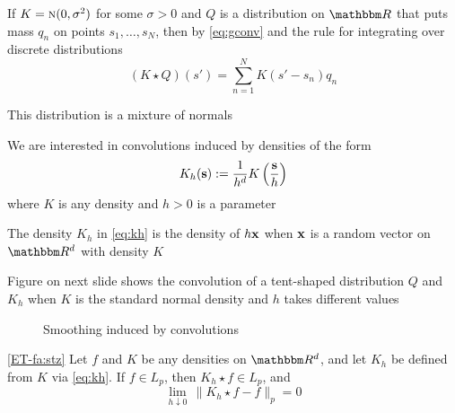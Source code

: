 \begin{frame}

    \vspace{2em}
    \Eg
    If $K = \textrm{\sc n}(0, \sigma^2)$ for some $\sigma > 0$ and $Q$ is a
    distribution on $\RR$ that puts mass $q_n$ on points $s_1, \ldots,
    s_N$, then by \eqref{eq:gconv} 
    and the rule for integrating over discrete distributions 
    \begin{equation}
        \label{eq:gconvd}
        (K \star Q)(s') = \sum_{n=1}^N K(s' - s_n) q_n
    \end{equation}
    
    
    This distribution is a mixture of normals

\end{frame}

\begin{frame}

    \vspace{2em}
    We are interested in convolutions induced
    by densities of the form
    \begin{equation}
        \label{eq:kh}
        K_h({\mathbf s}) := \frac{1}{h^d} K \left( \frac{{\mathbf s}}{h} \right)
    \end{equation}
    where $K$ is any density and $h > 0$ is a parameter
    
    \vspace{.7em}
    The density
    $K_h$ in \eqref{eq:kh} is the density of
    $h {\mathbf x}$ when ${\mathbf x}$ is a random vector 
    on $\RR^d$ with density $K$
    
    \vspace{.7em}
    \Eg
    Figure on next slide shows the convolution of a tent-shaped
    distribution $Q$ and $K_h$ when $K$ is the standard normal density
    and $h$ takes different values

\end{frame}

\begin{frame}

    \begin{figure}
        \centering
        \caption{\label{f:convolve} Smoothing induced by convolutions}
    \end{figure}

\end{frame}

\begin{frame}

    \vspace{2em}
    \Fact
    \eqref{ET-fa:stz}
    Let $f$ and $K$ be any densities on $\RR^d$, and let $K_h$ be defined from
    $K$ via \eqref{eq:kh}.  If $f \in L_p$, then $K_h \star f \in L_p$, and 
    \begin{equation*}
        \lim_{h \downarrow 0} \, \| K_h \star f - f \|_p = 0
    \end{equation*}

\end{frame}

